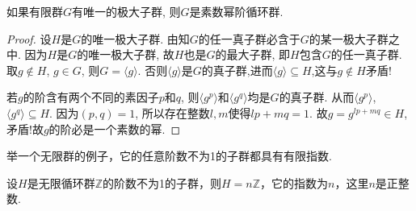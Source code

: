 \documentclass[../../main.tex]{subfiles}%
\begin{document}
\begin{proposition}\label{proposition:有限群唯一极大子群则必为素数幂阶循环群}
如果有限群$G$有唯一的极大子群, 则$G$是素数幂阶循环群.
\end{proposition}
\begin{proof}

设$H$是$G$的唯一极大子群. 由知$G$的任一真子群必含于$G$的某一极大子群之中. 因为$H$是$G$的唯一极大子群, 故$H$也是$G$的最大子群, 即$H$包含$G$的任一真子群. 取$g \notin H$, $g \in G$, 则$G = \langle g \rangle$. 否则$\langle g \rangle$是$G$的真子群,进而$\langle g \rangle \subseteq H$,这与$g\notin H$矛盾!

若$g$的阶含有两个不同的素因子$p$和$q$, 则$\langle g^p \rangle$和$\langle g^q \rangle$均是$G$的真子群. 从而$\langle g^p \rangle$, $\langle g^q \rangle \subseteq H$. 因为$(p,q)=1$, 所以存在整数$l,m$使得$lp + mq = 1$. 故$g = g^{lp+mq} \in H$, 矛盾!故$g$的阶必是一个素数的幂.
\end{proof}

\begin{example}
举一个无限群的例子，它的任意阶数不为1的子群都具有有限指数.
\end{example}
\begin{solution}
设$H$是无限循环群$\mathbb{Z}$的阶数不为1的子群，则$H=n\mathbb{Z}$，它的指数为$n$，这里$n$是正整数.

\end{solution}
\end{document}
